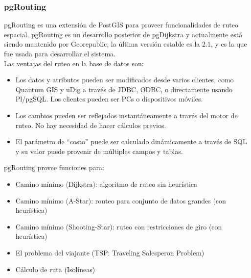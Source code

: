      \subsubsection{pgRouting} %
      \label{sec:pgrouting}
        pgRouting es una extensi\'on  de  PostGIS para proveer funcionalidades de ruteo espacial. pgRouting es un desarrollo posterior de pgDijkstra y actualmente está siendo mantenido por Georepublic, la última versi\'on estable es la 2.1, y es la que fue usada para desarrollar el sistema.\\

        Las ventajas del ruteo en la base de datos son:
        \begin{itemize}
          \item Los datos y atributos pueden ser modificados desde varios clientes, como Quantum GIS y uDig a través de JDBC, ODBC, o directamente usando Pl/pgSQL. Los clientes pueden ser PCs o dispositivos móviles.
          \item Los cambios pueden ser reflejados instantáneamente a través del motor de ruteo. No hay necesidad de hacer cálculos previos.
          \item El parámetro de ``costo'' puede ser calculado dinámicamente a través de SQL y su valor puede provenir de múltiples campos y tablas.
        \end{itemize}

        pgRouting provee funciones para:
        \begin{itemize}
          \item Camino mínimo (Dijkstra): algoritmo de ruteo sin heurística
          \item Camino mínimo (A-Star): routeo para conjunto de datos grandes (con heurística)
          \item Camino mínimo (Shooting-Star): ruteo con restricciones de giro (con heurística)
          \item El problema del viajante (TSP: Traveling Salesperon Problem)
          \item Cálculo de ruta (Isolíneas)
        \end{itemize}

